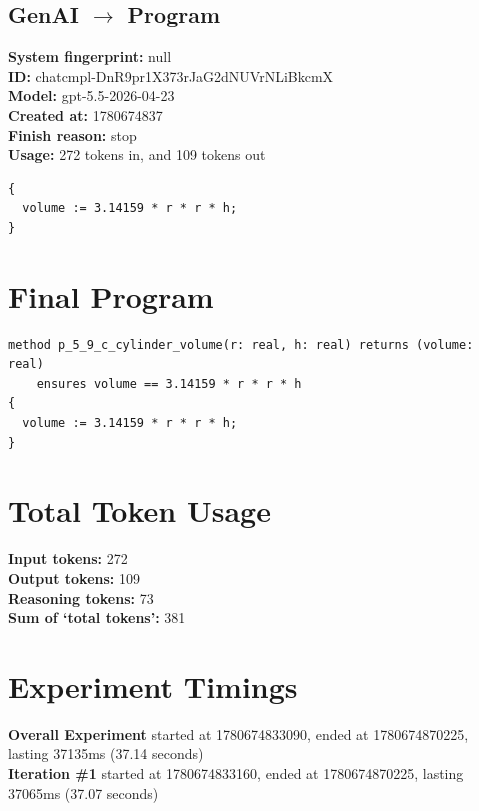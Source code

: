 \documentclass{article}
\begin{document}
\subsection*{GenAI $\rightarrow$ Program}
\textbf{System fingerprint: }null
\\\textbf{ID: }chatcmpl-DnR9pr1X373rJaG2dNUVrNLiBkcmX
\\\textbf{Model: }gpt-5.5-2026-04-23
\\\textbf{Created at: }1780674837
\\\textbf{Finish reason: }stop
\\\textbf{Usage: }272 tokens in, and 109 tokens out
\begin{lstlisting}
{
  volume := 3.14159 * r * r * h;
}
\end{lstlisting}
\section*{Final Program}
\begin{lstlisting}
method p_5_9_c_cylinder_volume(r: real, h: real) returns (volume: real)
	ensures volume == 3.14159 * r * r * h
{
  volume := 3.14159 * r * r * h;
}
\end{lstlisting}
\section*{Total Token Usage}
\textbf{Input tokens: }272
\\\textbf{Output tokens: }109
\\\textbf{Reasoning tokens: }73
\\\textbf{Sum of `total tokens': }381
\section*{Experiment Timings}
\textbf{Overall Experiment} started at 1780674833090, ended at 1780674870225, lasting 37135ms (37.14 seconds)
\\\textbf{Iteration \#1} started at 1780674833160, ended at 1780674870225, lasting 37065ms (37.07 seconds)
\end{document}

